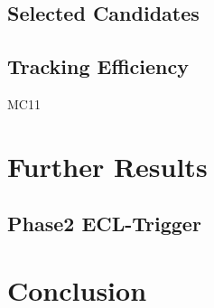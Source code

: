 \documentclass[a4paper,11pt,twosided,final,german,openbib,pdftex,listof=totoc,bibliography=totoc]{scrbook}
\begin{document}
\section{Selected Candidates}

\section{Tracking Efficiency}







MC11


\chapter{Further Results}

\section{Phase2 ECL-Trigger}
\label{sec:ECLTriggerPhase2}
\chapter{Conclusion}
\end{document}
